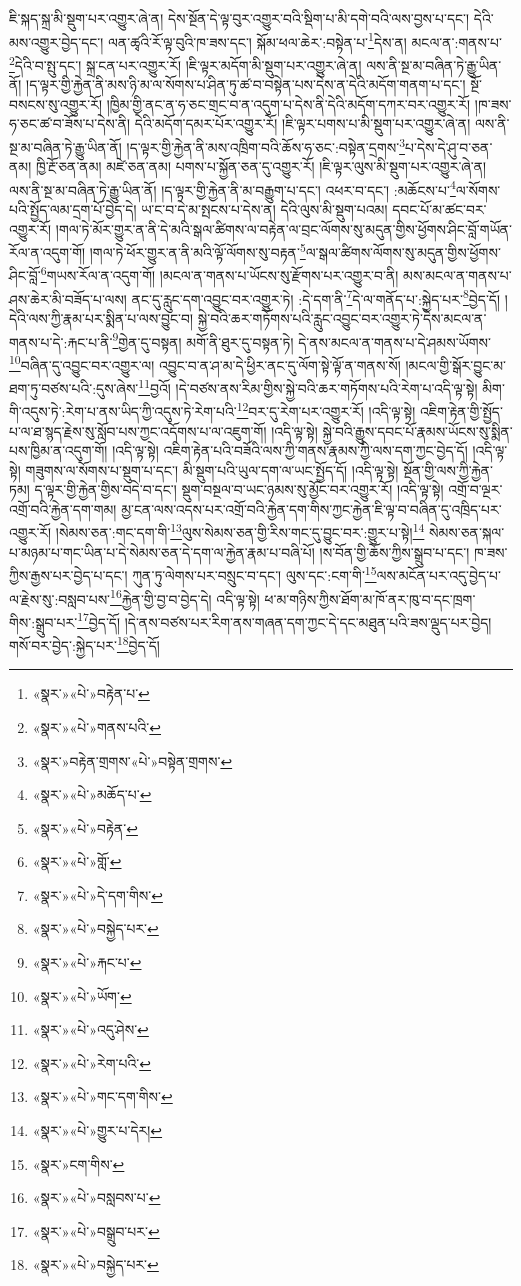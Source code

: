 ཇི་སྐད་སྐྲ་མི་སྡུག་པར་འགྱུར་ཞེ་ན། དེས་སྔོན་དེ་ལྟ་བུར་འགྱུར་བའི་སྡིག་པ་མི་དགེ་བའི་ལས་བྱས་པ་དང་། དེའི་མས་འགྱུར་བྱེད་དང་། ལན་ཚྭའི་རོ་ལྟ་བུའི་ཁ་ཟས་དང་། སྐོམ་ཕལ་ཆེར་:བསྟེན་པ་\footnote{«སྣར་»«པེ་»བརྟེན་པ་}དེས་ན། མངལ་ན་:གནས་པ་\footnote{«སྣར་»«པེ་»གནས་པའི་}དེའི་བ་སྤུ་དང་། སྐྲ་ངན་པར་འགྱུར་རོ། །ཇི་ལྟར་མདོག་མི་སྡུག་པར་འགྱུར་ཞེ་ན། ལས་ནི་སྔ་མ་བཞིན་ཏེ་རྒྱུ་ཡིན་ནོ། །ད་ལྟར་གྱི་རྐྱེན་ནི་མས་ཉི་མ་ལ་སོགས་པ་ཤིན་ཏུ་ཚ་བ་བསྟེན་པས་དེས་ན་དེའི་མདོག་གནག་པ་དང་། སྔོ་བསངས་སུ་འགྱུར་རོ། །ཁྱིམ་གྱི་ནང་ན་ཧ་ཅང་གྲང་བ་ན་འདུག་པ་དེས་ནི་དེའི་མདོག་དཀར་བར་འགྱུར་རོ། །ཁ་ཟས་ཧ་ཅང་ཚ་བ་ཟོས་པ་དེས་ནི། དེའི་མདོག་དམར་པོར་འགྱུར་རོ། །ཇི་ལྟར་པགས་པ་མི་སྡུག་པར་འགྱུར་ཞེ་ན། ལས་ནི་སྔ་མ་བཞིན་ཏེ་རྒྱུ་ཡིན་ནོ། །ད་ལྟར་གྱི་རྐྱེན་ནི་མས་འཁྲིག་བའི་ཆོས་ཧ་ཅང་:བསྟེན་དྲགས་\footnote{«སྣར་»བརྟེན་གྲགས་«པེ་»བསྟེན་གྲགས་}པ་དེས་དེ་ཤུ་བ་ཅན་ནམ། ཁྱི་རྔོ་ཅན་ནམ། མཛེ་ཅན་ནམ། པགས་པ་སྐྱོན་ཅན་དུ་འགྱུར་རོ། །ཇི་ལྟར་ལུས་མི་སྡུག་པར་འགྱུར་ཞེ་ན། ལས་ནི་སྔ་མ་བཞིན་ཏེ་རྒྱུ་ཡིན་ནོ། །ད་ལྟར་གྱི་རྐྱེན་ནི་མ་བརྒྱུག་པ་དང་། འཕར་བ་དང་། :མཆོངས་པ་\footnote{«སྣར་»«པེ་»མཆོད་པ་}ལ་སོགས་པའི་སྤྱོད་ལམ་དྲག་པོ་བྱེད་དེ། ཡ་ང་བ་དེ་མ་སྤངས་པ་དེས་ན། དེའི་ལུས་མི་སྡུག་པའམ། དབང་པོ་མ་ཚང་བར་འགྱུར་རོ། །གལ་ཏེ་མོར་གྱུར་ན་ནི་དེ་མའི་སྒལ་ཚིགས་ལ་བརྟེན་ལ་བྲང་ལོགས་སུ་མདུན་གྱིས་ཕྱོགས་ཤིང་བློ་གཡོན་རོལ་ན་འདུག་གོ། །གལ་ཏེ་ཕོར་གྱུར་ན་ནི་མའི་ལྟོ་ལོགས་སུ་བརྟན་\footnote{«སྣར་»«པེ་»བརྟེན་}ལ་སྒལ་ཚིགས་ལོགས་སུ་མདུན་གྱིས་ཕྱོགས་ཤིང་བློ་\footnote{«སྣར་»«པེ་»གློ་}གཡས་རོལ་ན་འདུག་གོ། །མངལ་ན་གནས་པ་ཡོངས་སུ་རྫོགས་པར་འགྱུར་བ་ནི། མས་མངལ་ན་གནས་པ་ཤས་ཆེར་མི་བཟོད་པ་ལས། ནང་དུ་རླུང་དག་འབྱུང་བར་འགྱུར་ཏེ། :དེ་དག་ནི་\footnote{«སྣར་»«པེ་»དེ་དག་གིས་}དེ་ལ་གནོད་པ་:སྐྱེད་པར་\footnote{«སྣར་»«པེ་»བསྐྱེད་པར་}བྱེད་དོ། །དེའི་ལས་ཀྱི་རྣམ་པར་སྨིན་པ་ལས་བྱུང་བ། སྐྱེ་བའི་ཆར་གཏོགས་པའི་རླུང་འབྱུང་བར་འགྱུར་ཏེ་དེས་མངལ་ན་གནས་པ་དེ་:རྐང་པ་ནི་\footnote{«སྣར་»«པེ་»རྐང་པ་}གྱེན་དུ་བསྟན། མགོ་ནི་ཐུར་དུ་བསྟན་ཏེ། དེ་ནས་མངལ་ན་གནས་པ་དེ་ཤམས་ཡོགས་\footnote{«སྣར་»«པེ་»ཡོག་}བཞིན་དུ་འབྱུང་བར་འགྱུར་ལ། འབྱུང་བ་ན་ཤ་མ་དེ་ཕྱིར་ནང་དུ་ལོག་སྟེ་ལྟོ་ན་གནས་སོ། །མངལ་གྱི་སྒོར་བྱུང་མ་ཐག་ཏུ་བཙས་པའི་:དུས་ཞེས་\footnote{«སྣར་»«པེ་»འདུ་ཤེས་}བྱའོ། །དེ་བཙས་ནས་རིམ་གྱིས་སྐྱེ་བའི་ཆར་གཏོགས་པའི་རེག་པ་འདི་ལྟ་སྟེ། མིག་གི་འདུས་ཏེ་:རེག་པ་ནས་ཡིད་ཀྱི་འདུས་ཏེ་རེག་པའི་\footnote{«སྣར་»«པེ་»རེག་པའི་}བར་དུ་རེག་པར་འགྱུར་རོ། །འདི་ལྟ་སྟེ། འཇིག་རྟེན་གྱི་སྤྱོད་པ་ལ་ཐ་སྙད་རྗེས་སུ་སློབ་པས་ཀྱང་འདོགས་པ་ལ་འཇུག་གོ། །འདི་ལྟ་སྟེ། སྐྱེ་བའི་རྒྱུས་དབང་པོ་རྣམས་ཡོངས་སུ་སྨིན་པས་ཁྱིམ་ན་འདུག་གོ། །འདི་ལྟ་སྟེ། འཇིག་རྟེན་པའི་བཟོའི་ལས་ཀྱི་གནས་རྣམས་ཀྱི་ལས་དག་ཀྱང་བྱེད་དོ། །འདི་ལྟ་སྟེ། གཟུགས་ལ་སོགས་པ་སྡུག་པ་དང་། མི་སྡུག་པའི་ཡུལ་དག་ལ་ཡང་སྤྱོད་དོ། །འདི་ལྟ་སྟེ། སྔོན་གྱི་ལས་ཀྱི་རྐྱེན་ཏམ། ད་ལྟར་གྱི་རྐྱེན་གྱིས་བདེ་བ་དང་། སྡུག་བསྔལ་བ་ཡང་ཉམས་སུ་མྱོང་བར་འགྱུར་རོ། །འདི་ལྟ་སྟེ། འགྲོ་བ་ལྔར་འགྲོ་བའི་རྐྱེན་དག་གམ། མྱ་ངན་ལས་འདས་པར་འགྲོ་བའི་རྐྱེན་དག་གིས་ཀྱང་རྐྱེན་ཇི་ལྟ་བ་བཞིན་དུ་འཁྲིད་པར་འགྱུར་རོ། །སེམས་ཅན་:གང་དག་གི་\footnote{«སྣར་»«པེ་»གང་དག་གིས་}ལུས་སེམས་ཅན་གྱི་རིས་གང་དུ་བྱུང་བར་:གྱུར་པ་སྟེ།\footnote{«སྣར་»«པེ་»གྱུར་པ་དེར།} སེམས་ཅན་སྐལ་པ་མཉམ་པ་གང་ཡིན་པ་དེ་སེམས་ཅན་དེ་དག་ལ་རྐྱེན་རྣམ་པ་བཞི་པོ། །ས་བོན་གྱི་ཆོས་ཀྱིས་སྒྲུབ་པ་དང་། ཁ་ཟས་ཀྱིས་རྒྱས་པར་བྱེད་པ་དང་། ཀུན་ཏུ་ལེགས་པར་བསྲུང་བ་དང་། ལུས་དང་:ངག་གི་\footnote{«སྣར་»ངག་གིས་}ལས་མངོན་པར་འདུ་བྱེད་པ་ལ་རྗེས་སུ་:བསླབ་པས་\footnote{«སྣར་»«པེ་»བསླབས་པ་}རྐྱེན་གྱི་བྱ་བ་བྱེད་དེ། འདི་ལྟ་སྟེ། ཕ་མ་གཉིས་ཀྱིས་ཐོག་མ་ཁོ་ནར་ཁུ་བ་དང་ཁྲག་གིས་:སྒྲུབ་པར་\footnote{«སྣར་»«པེ་»བསྒྲུབ་པར་}བྱེད་དོ། །དེ་ནས་བཙས་པར་རིག་ནས་གཞན་དག་ཀྱང་དེ་དང་མཐུན་པའི་ཟས་ལྡུད་པར་བྱེད། གསོ་བར་བྱེད་:སྐྱེད་པར་\footnote{«སྣར་»«པེ་»བསྐྱེད་པར་}བྱེད་དོ། 